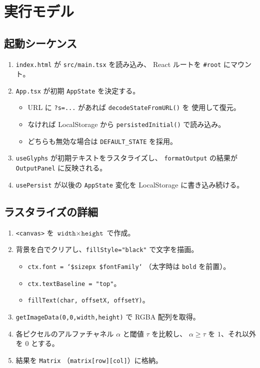 \section{実行モデル}

\subsection{起動シーケンス}

\begin{enumerate}[leftmargin=*,itemsep=2pt]
  \item \texttt{index.html} が \texttt{src/main.tsx} を読み込み、
        React ルートを \texttt{\#root} にマウント。
  \item \texttt{App.tsx} が初期 \texttt{AppState} を決定する。
    \begin{itemize}[leftmargin=*,itemsep=1pt]
      \item URL に \texttt{?s=...} があれば \texttt{decodeStateFromURL()} を
            使用して復元。
      \item なければ LocalStorage から \texttt{persistedInitial()} で読み込み。
      \item どちらも無効な場合は \texttt{DEFAULT\_STATE} を採用。
    \end{itemize}
  \item \texttt{useGlyphs} が初期テキストをラスタライズし、
        \texttt{formatOutput} の結果が \texttt{OutputPanel} に反映される。
  \item \texttt{usePersist} が以後の \texttt{AppState} 変化を
        LocalStorage に書き込み続ける。
\end{enumerate}

\subsection{ラスタライズの詳細}

\begin{enumerate}[leftmargin=*,itemsep=2pt]
  \item \texttt{<canvas>} を $\texttt{width}\times\texttt{height}$ で作成。
  \item 背景を白でクリアし、\texttt{fillStyle="black"} で文字を描画。
    \begin{itemize}[leftmargin=*,itemsep=1pt]
      \item \texttt{ctx.font = `\${size}px \${fontFamily}`}
            （太字時は \texttt{bold} を前置）。
      \item \texttt{ctx.textBaseline = "top"}。
      \item \texttt{fillText(char, offsetX, offsetY)}。
    \end{itemize}
  \item \texttt{getImageData(0,0,width,height)} で RGBA 配列を取得。
  \item 各ピクセルのアルファチャネル $\alpha$ と閾値 $\tau$ を比較し、
        $\alpha \ge \tau$ を $1$、それ以外を $0$ とする。
  \item 結果を \texttt{Matrix} （\texttt{matrix[row][col]}）に格納。
\end{enumerate}

